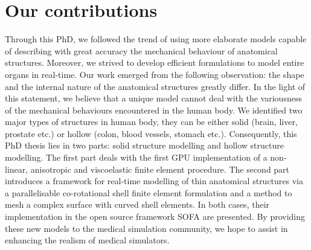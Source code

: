 \section{Our contributions}

Through this PhD, we followed the trend of using more elaborate models capable of describing with great accuracy the mechanical behaviour of anatomical structures. Moreover, we strived to develop efficient formulations to model entire organs in real-time. Our work emerged from the following observation: the shape and the internal nature of the anatomical structures greatly differ. In the light of this statement, we believe that a unique model cannot deal with the variousness of the mechanical behaviours encountered in the human body. We identified two major types of structures in human body, they can be either solid (brain, liver, prostate etc.) or hollow (colon, blood vessels, stomach etc.). Consequently, this PhD thesis lies in two parts: solid structure modelling and hollow structure modelling. The first part deals with the first GPU implementation of a non-linear, anisotropic and viscoelastic finite element procedure. The second part introduces a framework for real-time modelling of thin anatomical structures via a parallelisable co-rotational shell finite element formulation and a method to mesh a complex surface with curved shell elements. In both cases, their implementation in the open source framework SOFA are presented. By providing these new models to the medical simulation community, we hope to assist in enhancing the realism of medical simulators. 




